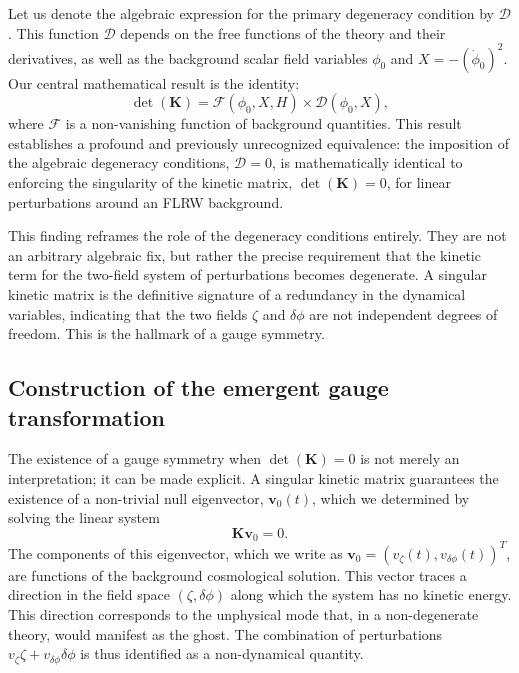\documentclass[twocolumn]{aastex631}
\begin{document}
Let us denote the algebraic expression for the primary degeneracy condition by $\mathcal{D}$. This function $\mathcal{D}$ depends on the free functions of the theory and their derivatives, as well as the background scalar field variables $\phi_0$ and $X = -(\dot{\phi}_0)^2$. Our central mathematical result is the identity:
\begin{equation}
\det(\mathbf{K}) = \mathcal{F}(\phi_0, X, H) \times \mathcal{D}(\phi_0, X),
\end{equation}
where $\mathcal{F}$ is a non-vanishing function of background quantities. This result establishes a profound and previously unrecognized equivalence: the imposition of the algebraic degeneracy conditions, $\mathcal{D}=0$, is mathematically identical to enforcing the singularity of the kinetic matrix, $\det(\mathbf{K})=0$, for linear perturbations around an FLRW background.

This finding reframes the role of the degeneracy conditions entirely. They are not an arbitrary algebraic fix, but rather the precise requirement that the kinetic term for the two-field system of perturbations becomes degenerate. A singular kinetic matrix is the definitive signature of a redundancy in the dynamical variables, indicating that the two fields $\zeta$ and $\delta\phi$ are not independent degrees of freedom. This is the hallmark of a gauge symmetry.

\subsection{Construction of the emergent gauge transformation}

The existence of a gauge symmetry when $\det(\mathbf{K})=0$ is not merely an interpretation; it can be made explicit. A singular kinetic matrix guarantees the existence of a non-trivial null eigenvector, $\mathbf{v}_0(t)$, which we determined by solving the linear system
\begin{equation}
\mathbf{K} \mathbf{v}_0 = 0.
\end{equation}
The components of this eigenvector, which we write as $\mathbf{v}_0 = (v_\zeta(t), v_{\delta\phi}(t))^T$, are functions of the background cosmological solution. This vector traces a direction in the field space $(\zeta, \delta\phi)$ along which the system has no kinetic energy. This direction corresponds to the unphysical mode that, in a non-degenerate theory, would manifest as the ghost. The combination of perturbations $v_\zeta \zeta + v_{\delta\phi} \delta\phi$ is thus identified as a non-dynamical quantity.
\end{document}
